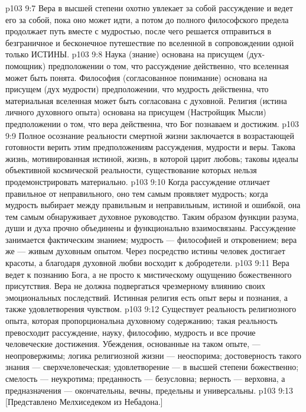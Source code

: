 \vs p103 9:7 Вера в высшей степени охотно увлекает за собой рассуждение и ведет его за собой, пока оно может идти, а потом до полного философского предела продолжает путь вместе с мудростью, после чего решается отправиться в безграничное и бесконечное путешествие по вселенной в сопровождении одной только ИСТИНЫ.
\vs p103 9:8 \pc Наука (знание) основана на присущем (дух\hyp{}помощник) предположении о том, что рассуждение действенно, что вселенная может быть понята. Философия (согласованное понимание) основана на присущем (дух мудрости) предположении, что мудрость действенна, что материальная вселенная может быть согласована с духовной. Религия (истина личного духовного опыта) основана на присущем (Настройщик Мысли) предположении о том, что вера действенна, что Бог познаваем и достижим.
\vs p103 9:9 Полное осознание реальности смертной жизни заключается в возрастающей готовности верить этим предположениям рассуждения, мудрости и веры. Такова жизнь, мотивированная истиной, жизнь, в которой царит любовь; таковы идеалы объективной космической реальности, существование которых нельзя продемонстрировать материально.
\vs p103 9:10 Когда рассуждение отличает правильное от неправильного, оно тем самым проявляет мудрость; когда мудрость выбирает между правильным и неправильным, истиной и ошибкой, она тем самым обнаруживает духовное руководство. Таким образом функции разума, души и духа прочно объединены и функционально взаимосвязаны. Рассуждение занимается фактическим знанием; мудрость --- философией и откровением; вера же --- живым духовным опытом. Через посредство истины человек достигает красоты, а благодаря духовной любви восходит к добродетели.
\vs p103 9:11 Вера ведет к познанию Бога, а не просто к мистическому ощущению божественного присутствия. Вера не должна подвергаться чрезмерному влиянию своих эмоциональных последствий. Истинная религия есть опыт веры и познания, а также удовлетворения чувством.
\vs p103 9:12 \pc Существует реальность религиозного опыта, которая пропорциональна духовному содержанию; такая реальность превосходит рассуждение, науку, философию, мудрость и все прочие человеческие достижения. Убеждения, основанные на таком опыте, --- неопровержимы; логика религиозной жизни --- неоспорима; достоверность такого знания --- сверхчеловеческая; удовлетворение --- в высшей степени божественно; смелость --- неукротима; преданность --- безусловна; верность --- верховна, а предназначения --- окончательны, вечны, предельны и универсальны.
\vsetoff
\vs p103 9:13 [Представлено Мелхиседеком из Небадона.]

